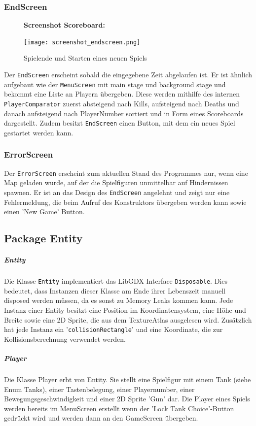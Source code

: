 \documentclass[a4paper]{scrreprt}
\def\code#1{\texttt{#1}}
\begin{document}
\subsubsection{EndScreen}
\begin{figure}[H]
  \textbf{Screenshot Scoreboard:}\par\medskip
  \centering
\texttt{[image: screenshot\_endscreen.png]}    
\caption{Spielende und Starten eines neuen Spiels}
\end{figure}
Der \code{EndScreen} erscheint sobald die eingegebene Zeit abgelaufen ist. Er ist ähnlich aufgebaut wie der \code{MenuScreen} mit main stage und background stage und bekommt eine Liste an Playern übergeben. Diese werden mithilfe des internen \code{PlayerComparator} zuerst absteigend nach Kills, aufsteigend nach Deaths und danach aufsteigend nach PlayerNumber sortiert und in Form eines Scoreboards dargestellt. Zudem besitzt \code{EndScreen} einen Button, mit dem ein neues Spiel gestartet werden kann.


\subsubsection*{ErrorScreen}
Der \code{ErrorScreen} erscheint zum aktuellen Stand des Programmes nur, wenn eine Map geladen wurde, auf der die Spielfiguren unmittelbar auf Hindernissen spawnen.
Er ist an das Design des \code{EndScreen} angelehnt und zeigt nur eine Fehlermeldung, die beim Aufruf des Konstruktors übergeben werden kann sowie einen 'New Game' Button.

\newpage
\subsection{Package Entity}
\subparagraph{Entity}
Die Klasse \code{Entity} implementiert das LibGDX Interface \code{Disposable}. Dies bedeutet, dass Instanzen dieser Klasse am Ende ihrer Lebenszeit manuell disposed werden müssen, da es sonst zu Memory Leaks kommen kann. 
Jede Instanz einer Entity besitzt eine Position im Koordinatensystem, eine Höhe und Breite sowie eine 2D Sprite, die aus dem TextureAtlas ausgelesen wird.
Zusätzlich hat jede Instanz ein '\code{collisionRectangle}' und eine Koordinate, die zur Kollisionsberechnung verwendet werden.


\subparagraph{Player}
Die Klasse Player erbt von Entity. Sie stellt eine Spielfigur mit einem Tank (siehe Enum Tanks), einer Tastenbelegung, einer Playernumber, einer Bewegungsgeschwindigkeit und einer 2D Sprite 'Gun' dar. Die Player eines Spiels werden bereits im MenuScreen erstellt wenn der 'Lock Tank Choice'-Button gedrückt wird und werden dann an den GameScreen übergeben.
\end{document}
